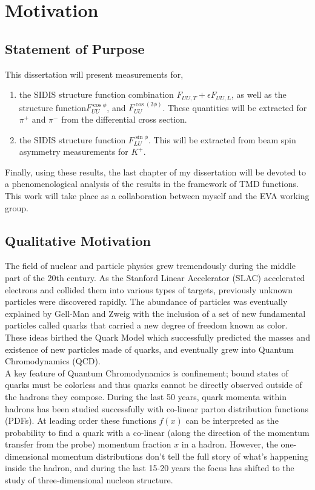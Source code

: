 
\section{Motivation}

\subsection{Statement of Purpose}
This dissertation will present measurements for, 

\begin{enumerate}
  \item the SIDIS structure function combination $F_{UU,T} + \epsilon F_{UU,L}$, as well as the structure function$F_{UU}^{\cos\phi}$, and $F_{UU}^{\cos(2\phi)}$.  These quantities will be extracted for $\pi^+$ and $\pi^-$ from the differential cross section.
  \item the SIDIS structure function $F_{LU}^{\sin\phi}$.  This will be extracted from beam spin asymmetry measurements for $K^{+}$.
\end{enumerate}

Finally, using these results, the last chapter of my dissertation will be devoted to a phenomenological analysis of the results in the framework of TMD functions.  This work will take place as a collaboration between myself and the EVA working group.

\subsection{Qualitative Motivation}

The field of nuclear and particle physics grew tremendously during the middle part of the 20th century.  As the Stanford Linear Accelerator (SLAC) accelerated electrons and collided them into various types of targets, previously unknown particles were discovered rapidly.  The abundance of particles was eventually explained by Gell-Man and Zweig with the inclusion of a set of new fundamental particles called quarks that carried a new degree of freedom known as color.  These ideas birthed the Quark Model which successfully predicted the masses and existence of new particles made of quarks, and eventually grew into Quantum Chromodynamics (QCD).  \\

A key feature of Quantum Chromodynamics is confinement; bound states of quarks must be colorless and thus quarks cannot be directly observed outside of the hadrons they compose.  During the last 50 years, quark momenta within hadrons has been studied successfully with co-linear parton distribution functions (PDFs).  At leading order these functions $f(x)$ can be interpreted as the probability to find a quark with a co-linear (along the direction of the momentum transfer from the probe) momentum fraction $x$ in a hadron.  However, the one-dimensional momentum distributions don't tell the full story of what's happening inside the hadron, and during the last 15-20 years the focus has shifted to the study of three-dimensional nucleon structure. \\

